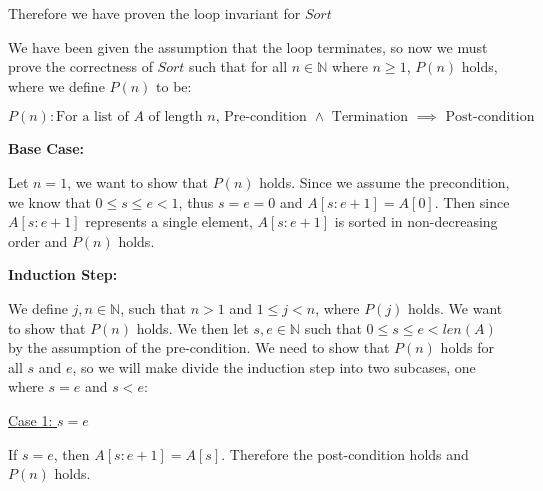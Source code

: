 \documentclass[20pt]{article}
\begin{document}
\noindent
\begin{text}
    Therefore we have proven the loop invariant for $Sort$\\
\end{text}

\noindent
\begin{text}
    We have been given the assumption that the loop terminates, so now we must prove the correctness of $Sort$ such that for all $n \in \mathbb{N}$ where $n \geq 1$, $P(n)$ holds, where we define $P(n)$ to be:
\end{text}
\begin{equation}
    P(n): \text{For a list of $A$ of length $n$, Pre-condition $\land$ Termination $\implies$ Post-condition} \nonumber
\end{equation}

\noindent
\textbf{Base Case: }\\
\begin{text}
    Let $n = 1$, we want to show that $P(n)$ holds. Since we assume the precondition, we know that $0 \leq s \leq e < 1$, thus $s = e = 0$ and $A[s:e+1] = A[0]$. Then since $A[s:e+1]$ represents a single element, $A[s:e+1]$ is sorted in non-decreasing order and $P(n)$ holds.\\
\end{text}

\noindent
\textbf{Induction Step: }\\
\begin{text}
    We define $j, n \in \mathbb{N}$, such that $n > 1$ and $1 \leq j < n$, where $P(j)$ holds. We want to show that $P(n)$ holds. We then let $s, e \in \mathbb{N}$ such that $0 \leq s \leq e < len(A)$ by the assumption of the pre-condition. We need to show that $P(n)$ holds for all $s$ and $e$, so we will make divide the induction step into two subcases, one where $s = e$ and $s < e$:\\
\end{text}

\noindent
\underline{Case 1: $s = e$}\\
\begin{text}
    If $s = e$, then $A[s: e + 1] = A[s]$. Therefore the post-condition holds and $P(n)$ holds.\\
\end{text}
\end{document}
